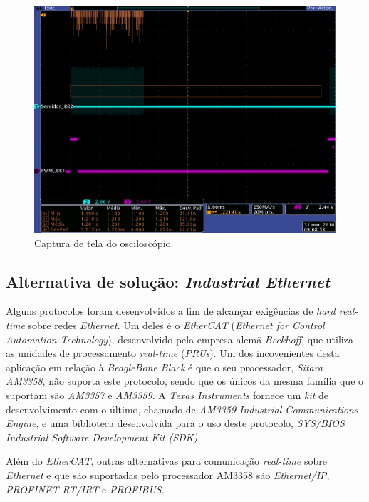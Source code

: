 \begin{figure}[h]

\centering
\includegraphics[scale=0.25]{image/tek_com_threads}
\caption {Captura de tela do osciloscópio.}
\label{fig:osciloscopio_thread}
\end{figure}

\subsection{Alternativa de solução: \textit{Industrial Ethernet}}

Alguns protocolos foram desenvolvidos a fim de alcançar exigências de
\textit{hard real-time} sobre redes \textit{Ethernet}. Um deles é o
\textit{EtherCAT} (\textit{Ethernet for Control Automation Technology}),
desenvolvido pela empresa alemã \textit{Beckhoff}, que utiliza as unidades de
processamento \textit{real-time} (\textit{PRUs}). Um dos incovenientes desta
aplicação em relação à \textit{BeagleBone Black} é que o seu processador,
\textit{Sitara AM3358}, não suporta este protocolo, sendo que os únicos da mesma
família que o suportam são \textit{AM3357} e \textit{AM3359}. A \textit{Texas
Instruments} fornece um \textit{kit} de desenvolvimento com o último, chamado de
\textit{AM3359 Industrial Communications Engine}, e uma biblioteca desenvolvida
para o uso deste protocolo, \textit{SYS/BIOS Industrial Software Development Kit
(SDK)}.

\vspace{12pt}

Além do \textit{EtherCAT}, outras alternativas para comunicação
\textit{real-time} sobre \textit{Ethernet} e que são suportadas pelo processador
AM3358 são \textit{Ethernet/IP}, \textit{PROFINET RT/IRT} e \textit{PROFIBUS}.
